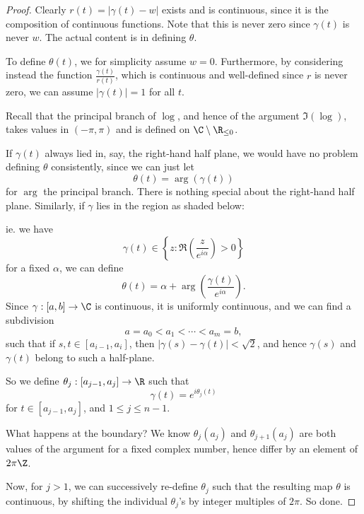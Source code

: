 \documentclass[a4paper]{article}
\begin{document}
\begin{proof}
  Clearly $r(t) = |\gamma(t) - w|$ exists and is continuous, since it is the composition of continuous functions. Note that this is never zero since $\gamma(t)$ is never $w$. The actual content is in defining $\theta$.

  To define $\theta(t)$, we for simplicity assume $w = 0$. Furthermore, by considering instead the function $\frac{\gamma(t)}{r(t)}$, which is continuous and well-defined since $r$ is never zero, we can assume $|\gamma(t)| = 1$ for all $t$.

  Recall that the principal branch of $\log$, and hence of the argument $\Im (\log)$, takes values in $(-\pi, \pi)$ and is defined on $\C \setminus \R_{\leq 0}$.
  \begin{center}
  \end{center}
  If $\gamma(t)$ always lied in, say, the right-hand half plane, we would have no problem defining $\theta$ consistently, since we can just let
  \[
    \theta(t) = \arg(\gamma(t))
  \]
  for $\arg$ the principal branch. There is nothing special about the right-hand half plane. Similarly, if $\gamma$ lies in the region as shaded below:
  \begin{center}
  \end{center}
  ie. we have
  \[
    \gamma(t) \in \left\{z : \Re\left(\frac{z}{e^{i\alpha}}\right) > 0\right\}
  \]
  for a fixed $\alpha$, we can define
  \[
    \theta(t) = \alpha + \arg\left(\frac{\gamma(t)}{e^{i\alpha}}\right).
  \]
  Since $\gamma: [a, b] \to \C$ is continuous, it is uniformly continuous, and we can find a subdivision
  \[
    a = a_0 < a_1 < \cdots < a_m = b,
  \]
  such that if $s, t \in [a_{i - 1}, a_i]$, then $|\gamma(s) - \gamma(t)| < \sqrt{2}$, and hence $\gamma(s)$ and $\gamma(t)$ belong to such a half-plane.

  So we define $\theta_j: [a_{j - 1}, a_j] \to \R$ such that
  \[
    \gamma(t) = e^{i\theta_j(t)}
  \]
  for $t \in [a_{j - 1}, a_j]$, and $1 \leq j \leq n - 1$.

  What happens at the boundary? We know $\theta_j(a_j)$ and $\theta_{j + 1}(a_j)$ are both values of the argument for a fixed complex number, hence differ by an element of $2\pi \Z$.

  Now, for $j > 1$, we can successively re-define $\theta_j$ such that the resulting map $\theta$ is continuous, by shifting the individual $\theta_j$'s by integer multiples of $2\pi$. So done.
\end{proof}
\end{document}
